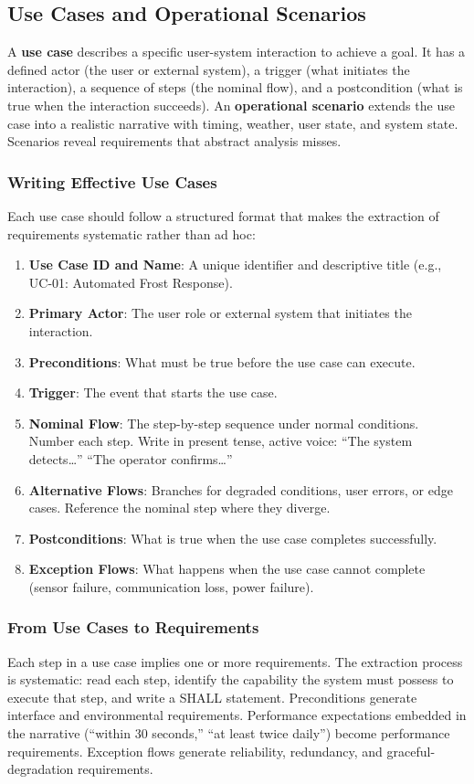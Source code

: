 \documentclass[11pt,letterpaper,twoside,openany]{book}
\begin{document}
\subsection{Use Cases and Operational Scenarios}
A \textbf{use case} describes a specific user-system interaction to achieve a goal. It has a defined actor (the user or external system), a trigger (what initiates the interaction), a sequence of steps (the nominal flow), and a postcondition (what is true when the interaction succeeds). An \textbf{operational scenario} extends the use case into a realistic narrative with timing, weather, user state, and system state. Scenarios reveal requirements that abstract analysis misses.

\subsubsection{Writing Effective Use Cases}
Each use case should follow a structured format that makes the extraction of requirements systematic rather than ad hoc:

\begin{enumerate}[leftmargin=1.5em]
\item \textbf{Use Case ID and Name}: A unique identifier and descriptive title (e.g., UC-01: Automated Frost Response).
\item \textbf{Primary Actor}: The user role or external system that initiates the interaction.
\item \textbf{Preconditions}: What must be true before the use case can execute.
\item \textbf{Trigger}: The event that starts the use case.
\item \textbf{Nominal Flow}: The step-by-step sequence under normal conditions. Number each step. Write in present tense, active voice: ``The system detects\ldots'' ``The operator confirms\ldots''
\item \textbf{Alternative Flows}: Branches for degraded conditions, user errors, or edge cases. Reference the nominal step where they diverge.
\item \textbf{Postconditions}: What is true when the use case completes successfully.
\item \textbf{Exception Flows}: What happens when the use case cannot complete (sensor failure, communication loss, power failure).
\end{enumerate}

\subsubsection{From Use Cases to Requirements}
Each step in a use case implies one or more requirements. The extraction process is systematic: read each step, identify the capability the system must possess to execute that step, and write a SHALL statement. Preconditions generate interface and environmental requirements. Performance expectations embedded in the narrative (``within 30 seconds,'' ``at least twice daily'') become performance requirements. Exception flows generate reliability, redundancy, and graceful-degradation requirements.
\end{document}
